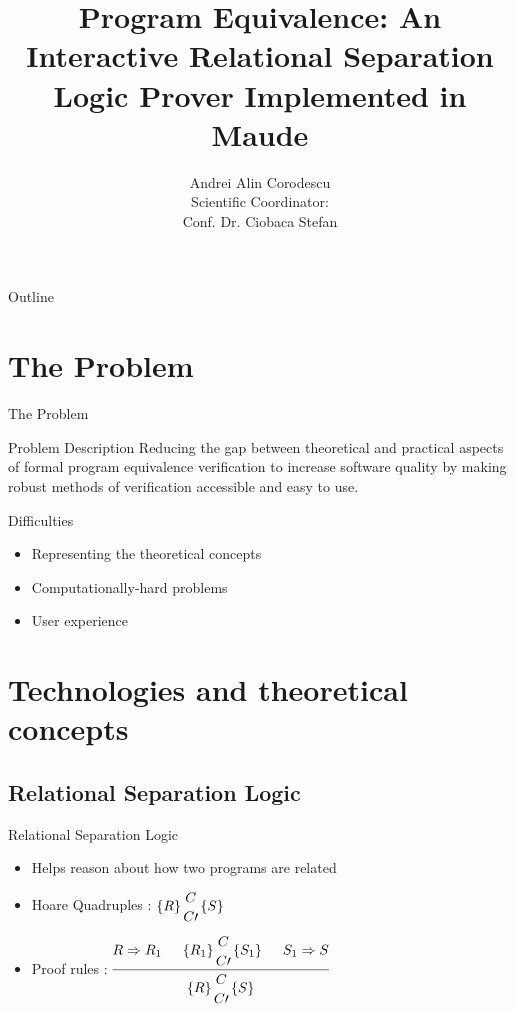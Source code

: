 \documentclass{beamer}
\title{Program Equivalence: An Interactive Relational Separation Logic Prover Implemented in Maude}
\author{Andrei Alin Corodescu \\ \vspace{1.5cm} Scientific Coordinator: \\ Conf. Dr. Ciobaca Stefan}
\institute[Alexandru Ioan Cuza University of Iasi] %
\newcommand{\hq}[4]{
	\left\{{#1}\right\}
	\let\scriptstyle\textstyle 
	\substack{{#2} \\ \\ 	\let\scriptstyle\textstyle {#3}} 
	\left\{{#4}\right\}
}
\begin{document}
\begin{frame}
  \titlepage
\end{frame}

\begin{frame}{Outline}
  \tableofcontents
\end{frame}

\section{The Problem}

\begin{frame}{The Problem}
\begin{block}{Problem Description}
    Reducing the gap between theoretical and practical aspects of formal program equivalence verification to increase software quality by making robust methods of verification accessible and easy to use.
    \pause
\end{block}
	\begin{block}{Difficulties}
		\begin{itemize}
			\item Representing the theoretical concepts
			\item Computationally-hard problems
			\item User experience
		\end{itemize}
	\end{block}
\end{frame}

\section{Technologies and theoretical concepts}

\subsection{Relational Separation Logic}
\begin{frame}{Relational Separation Logic}
\begin{itemize}
	\item Helps reason about how two programs are related
	\item {Hoare Quadruples : \(\hq{R}{C}{C\prime}{S}\)}
	\item {Proof rules : 	\(
		\begin{prooftree}
		\Hypo{R \Rightarrow R_1}
		\Hypo{\hq{R_1}{C}{C\prime}{S_1}}
		\Hypo{S_1 \Rightarrow S}
		\Infer 3 {\hq{R}{C}{C\prime}{S}}
		\end{prooftree}	
		\)
	}
\end{itemize}
\end{frame}
\end{document}

